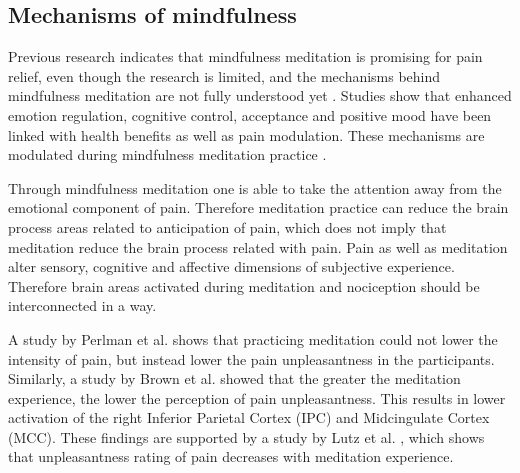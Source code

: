 

\subsection{Mechanisms of mindfulness}
Previous research indicates that mindfulness meditation is promising for pain relief, even though the research is limited, and the mechanisms behind mindfulness meditation are not fully understood yet \cite{Perlman2010}. 
Studies show that enhanced emotion regulation, cognitive control, acceptance and positive mood have been linked with health benefits as well as pain modulation. These mechanisms are modulated during mindfulness meditation practice \cite{Ziedan2016, Ziedan2012, Tang2014, Perlman2010, Ziedan2011}.

Through mindfulness meditation one is able to take the attention away from the emotional component of pain. Therefore meditation practice can reduce the brain process areas related to anticipation of pain, which does not imply that meditation reduce the brain process related with pain. \cite{Brown2010}
Pain as well as meditation alter sensory, cognitive and affective dimensions of subjective experience. Therefore brain areas activated during meditation and nociception should be interconnected in a way. \cite{Zeidan2011}

A study by Perlman et al. \cite{Perlman2010} shows that practicing meditation could not lower the intensity of pain, but instead lower the pain unpleasantness in the participants. \cite{Zeidan2012, Perlman2010} Similarly, a study by Brown et al. \cite{Brown2010} showed that the greater the meditation experience, the lower the perception of pain unpleasantness. This results in lower activation of the right Inferior Parietal Cortex (IPC) and Midcingulate Cortex (MCC).  These findings are supported by a study by Lutz et al. \cite{Lutz2013}, which shows that unpleasantness rating of pain decreases with meditation experience.
 



